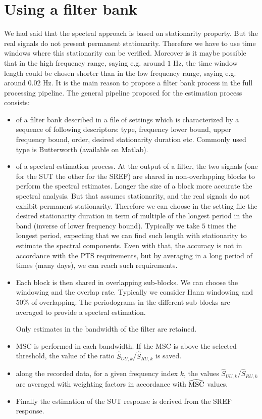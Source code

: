 \section{Using a filter bank}
We had said that the spectral approach is based on stationarity property. But the real signals do not present permanent stationarity. Therefore we have to use time windows where this stationarity can be verified. Moreover is it maybe possible that in the high frequency range, saying e.g. around $1$ Hz, the time window length could be chosen shorter than in the low frequency range, saying e.g. around $0.02$ Hz. It is the main reason to propose a filter bank process in the full processing pipeline. The general pipeline proposed for the estimation process consists:
\begin{itemize}
\item
of a filter bank described in a file of settings which is characterized by a sequence of following descriptors: type, frequency lower bound, upper frequency bound, order, desired stationarity duration etc. Commonly used type is Butterworth (available on Matlab).
\item
of a spectral estimation process. At the output of a filter, the two signals (one for the SUT the other for the SREF) are shared in non-overlapping blocks to perform the spectral estimates. Longer the size of a block more accurate the spectral analysis. But that assumes stationarity, and the real signals do not exhibit permanent stationarity. Therefore we can choose in the setting file the desired stationarity duration in term of multiple of the longest period in the band (inverse of lower frequency bound). Typically we take  $5$ times the longest period, expecting that we can find such length with stationarity to estimate the spectral components. Even with that, the accuracy is not in accordance with the PTS requirements, but by averaging in a long period of times (many days), we can reach such requirements.
\item
Each block is then shared in overlapping sub-blocks. We can choose the windowing and the overlap rate. Typically we consider Hann windowing and $50\%$ of overlapping. The periodograms in the different sub-blocks are averaged to provide a spectral estimation. 

Only estimates in the bandwidth of the filter are retained.
\item
MSC is performed in each bandwidth. If the MSC is above the selected threshold, the value of the ratio $\hat S_{UU,k}/\hat S_{RU,k}$ is saved.
\item
along the recorded data, for a given frequency index $k$, the values  $\hat S_{UU,k}/\hat S_{RU,k}$ are averaged with weighting factors in accordance with $\widehat{\mathrm{MSC}}$ values.
\item
Finally the estimation of the SUT response is derived from the SREF response.
\end{itemize}
